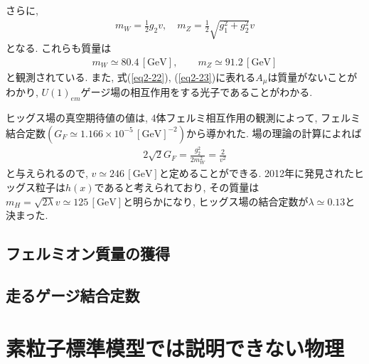 \documentclass[uplatex,dvipdfmx,a4paper,titlepage]{jsbook}
\theoremstyle{plain}
\theoremstyle{definition}
\begin{document}
さらに,
\begin{align}
  m_W = \frac{1}{2}g_2v,\quad m_Z = \frac{1}{2}\sqrt{g_1^2+g_2^2}v\nonumber
\end{align}
となる.
これらも質量は
\begin{align}
  m_W \simeq 80.4\,\mathrm{[GeV]},\qquad m_Z \simeq 91.2\,\mathrm{[GeV]} \nonumber
\end{align}
と観測されている.
また, 式(\ref{eq2-22}), (\ref{eq2-23})に表れる$A_\mu$は質量がないことがわかり, $U(1)_{em}$ゲージ場の相互作用をする光子であることがわかる.

ヒッグス場の真空期待値の値は, 4体フェルミ相互作用の観測によって, フェルミ結合定数$(G_F\simeq 1.166\times 10^{-5}\,\mathrm{[GeV]}^{-2})$から導かれた.
場の理論の計算によれば
\begin{align}
  2\sqrt{2}G_F = \frac{g_2^2}{2m_W^2} = \frac{2}{v^2}\nonumber
\end{align}
と与えられるので, $v \simeq 246\,\mathrm{[GeV]}$と定めることができる.
2012年に発見されたヒッグス粒子は$h(x)$であると考えられており, その質量は$m_H = \sqrt{2\lambda}v \simeq 125\,\mathrm{[GeV]}$と明らかになり, ヒッグス場の結合定数が$\lambda \simeq 0.13$と決まった.
\section{フェルミオン質量の獲得}
\section{走るゲージ結合定数}




\chapter{素粒子標準模型では説明できない物理}
%
%
\end{document}
